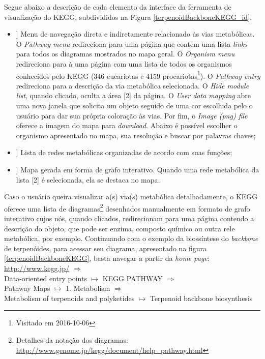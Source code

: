 \indent Segue abaixo a descrição de cada elemento da interface da ferramenta de visualização do KEGG, subdivididos na Figura \ref{terpenoidBackboneKEGG_id}.

\begin{itemize}
\item[[ 1]] Menu de navegação direta e indiretamente relacionado às vias metabólicas. O \textit{Pathway menu} redireciona para uma página que contém uma lista \textit{links} para todos os diagramas mostrados no mapa geral. O \textit{Organism menu} redireciona para à uma página com uma lista de todos os organismos conhecidos pelo KEGG (346 eucariotas e 4159 procariotas\footnote{Visitado em 2016-10-06}). O \textit{Pathway entry} redireciona para a descrição da via metabólica selecionada. O \textit{Hide module list}, quando clicado, oculta a área [2] da página. O \textit{User data mapping} abre uma nova janela que solicita um objeto seguido de uma cor escolhida pelo o usuário para dar sua própria coloração às vias. Por fim, o \textit{Image (png) file} oferece a imagem do mapa para \textit{download}. Abaixo é possível escolher o organismo apresentado no mapa, sua resolução e buscar por palavras chaves;
\item[[ 2]] Lista de redes metabólicas organizadas de acordo com suas funções;
\item[[ 3]] Mapa gerada em forma de grafo interativo. Quando uma rede metabólica da lista [2] é selecionada, ela se destaca no mapa.
\end{itemize}

\indent Caso o usuário queira visualizar a(s) via(s) metabólica detalhadamente, o KEGG oferece uma lista de diagramas\footnote{Detalhes da notação dos diagramas: \url{http://www.genome.jp/kegg/document/help_pathway.html}} desenhados manualmente em formato de grafo interativo cujos nós, quando clicados, redirecionam para uma página contendo a descrição do objeto, que pode ser enzima, composto químico ou outra rele metabólica, por exemplo. Continuando com o exemplo da biossíntese do \textit{backbone} de terpenóides, para acessar seu diagrama, apresentado na figura \ref{terpenoidBackboneKEGG}, basta navegar a partir da \textit{home page}: \\

\indent \url{http://www.kegg.jp/} $\Rightarrow$ \\
\indent Data-oriented entry points  $\mapsto$ KEGG PATHWAY $\Rightarrow$ \\
\indent Pathway Maps $\mapsto$ 1. Metabolism  $\Rightarrow$ \\
 Metabolism of terpenoids and polyketides  $\mapsto$ Terpenoid backbone biosynthesis \\

